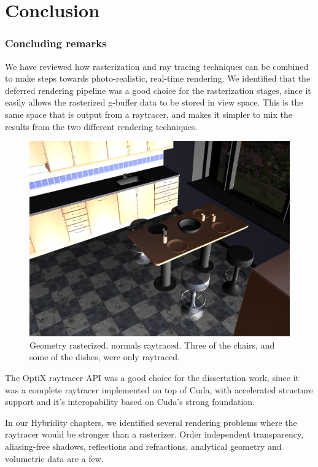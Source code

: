 \part{Conclusion}

\section{Concluding remarks}
We have reviewed how rasterization and ray tracing techniques can be combined to make steps towards photo-realistic, real-time rendering. We identified that the deferred rendering pipeline was a good choice for the rasterization stages, since it easily allows the rasterized g-buffer data to be stored in view space. This is the same space that is output from a raytracer, and makes it simpler to mix the results from the two different rendering techniques.

\begin{figure}[H]
	\centering
	\includegraphics[width=1.00\textwidth]{Media/hybrid.png}
	\caption{Geometry rasterized, normals raytraced. Three of the chairs, and some of the dishes, were only raytraced.}
	\label{fig:hybrid_image01}
\end{figure}

The OptiX raytracer API was a good choice for the dissertation work, since it was a complete raytracer implemented on top of Cuda, with accelerated structure support and it's interopability based on Cuda's strong foundation.

In our Hybridity chapters, we identified several rendering problems where the raytracer would be stronger than a rasterizer. Order independent transparency, aliasing-free shadows, reflections and refractions, analytical geometry and volumetric data are a few.

